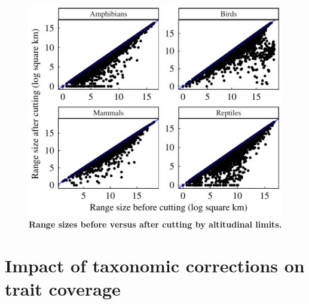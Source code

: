 \begin{figure}[h!]
\centering
\includegraphics[scale=0.7]{Supporting/Chapter2/Figures/Rangesizes/RangeSizes_before_aftercuts}
\caption[Range sizes before versus after cutting by altitudinal limits]{\textbf{Range sizes before versus after cutting by altitudinal limits.}}
\label{SI2_cutalt_ranges}
\end{figure}

\pagebreak

\section{Impact of taxonomic corrections on trait coverage}

